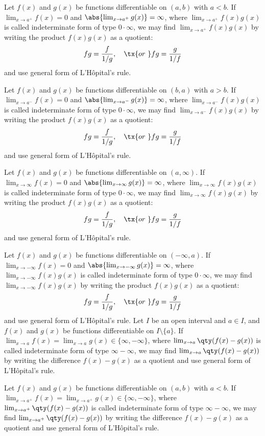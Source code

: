 \documentclass[a4paper,12pt]{report}
\begin{document}
\begin{itemize}
\begin{itemize}
Let $f(x)$ and $g(x)$ be functions differentiable on $(a,b)$ with $a<b$. If $\lim_{x\to a^+}f(x)=0$ and $\abs{\lim_{x\to a^+}g(x)}=\infty$, where $\lim_{x\to a^+}f(x)g(x)$ is called indeterminate form of type $0\cdot\infty$, we may find $\lim_{x\to a^+}f(x)g(x)$ by writing the product $f(x)g(x)$ as a quotient:
\[fg=\frac{f}{1/g},\quad\tx{or\ }fg=\frac{g}{1/f}\]
and use general form of L'Hôpital's rule.

Let $f(x)$ and $g(x)$ be functions differentiable on $(b,a)$ with $a>b$. If $\lim_{x\to a^-}f(x)=0$ and $\abs{\lim_{x\to a^-}g(x)}=\infty$, where $\lim_{x\to a^-}f(x)g(x)$ is called indeterminate form of type $0\cdot\infty$, we may find $\lim_{x\to a^-}f(x)g(x)$ by writing the product $f(x)g(x)$ as a quotient:
\[fg=\frac{f}{1/g},\quad\tx{or\ }fg=\frac{g}{1/f}\]
and use general form of L'Hôpital's rule.

Let $f(x)$ and $g(x)$ be functions differentiable on $(a,\infty)$. If $\lim_{x\to\infty}f(x)=0$ and $\abs{\lim_{x\to\infty}g(x)}=\infty$, where $\lim_{x\to\infty}f(x)g(x)$ is called indeterminate form of type $0\cdot\infty$, we may find $\lim_{x\to\infty}f(x)g(x)$ by writing the product $f(x)g(x)$ as a quotient:
\[fg=\frac{f}{1/g},\quad\tx{or\ }fg=\frac{g}{1/f}\]
and use general form of L'Hôpital's rule.

Let $f(x)$ and $g(x)$ be functions differentiable on $(-\infty,a)$. If $\lim_{x\to -\infty}f(x)=0$ and $\abs{\lim_{x\to -\infty}g(x)}=\infty$, where $\lim_{x\to -\infty}f(x)g(x)$ is called indeterminate form of type $0\cdot\infty$, we may find $\lim_{x\to -\infty}f(x)g(x)$ by writing the product $f(x)g(x)$ as a quotient:
\[fg=\frac{f}{1/g},\quad\tx{or\ }fg=\frac{g}{1/f}\]
and use general form of L'Hôpital's rule.
Let $I$ be an open interval and $a\in I$, and $f(x)$ and $g(x)$ be functions differentiable on $I\setminus\{a\}$. If $\lim_{x\to a}f(x)=\lim_{x\to a}g(x)\in\{\infty,-\infty\}$, where $\lim_{x\to a}\qty(f(x)-g(x))$ is called indeterminate form of type $\infty-\infty$, we may find $\lim_{x\to a}\qty(f(x)-g(x))$ by writing the difference $f(x)-g(x)$ as a quotient and use general form of L'Hôpital's rule.

Let $f(x)$ and $g(x)$ be functions differentiable on $(a,b)$ with $a<b$. If $\lim_{x\to a^+}f(x)=\lim_{x\to a^+}g(x)\in\{\infty,-\infty\}$, where $\lim_{x\to a^+}\qty(f(x)-g(x))$ is called indeterminate form of type $\infty-\infty$, we may find $\lim_{x\to a^+}\qty(f(x)-g(x))$ by writing the difference $f(x)-g(x)$ as a quotient and use general form of L'Hôpital's rule.


\end{itemize}
\end{itemize}
\end{document}
